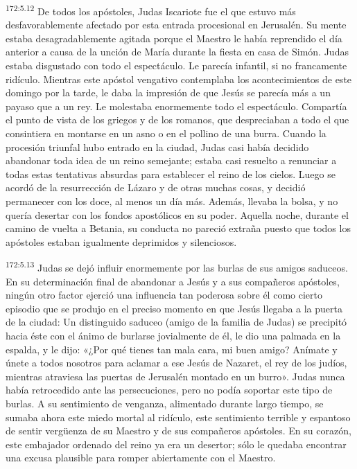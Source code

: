 \par
\textsuperscript{172:5.12} De todos los apóstoles, Judas Iscariote fue el que estuvo más desfavorablemente afectado por esta entrada procesional en Jerusalén. Su mente estaba desagradablemente agitada porque el Maestro le había reprendido el día anterior a causa de la unción de María durante la fiesta en casa de Simón. Judas estaba disgustado con todo el espectáculo. Le parecía infantil, si no francamente ridículo. Mientras este apóstol vengativo contemplaba los acontecimientos de este domingo por la tarde, le daba la impresión de que Jesús se parecía más a un payaso que a un rey. Le molestaba enormemente todo el espectáculo. Compartía el punto de vista de los griegos y de los romanos, que despreciaban a todo el que consintiera en montarse en un asno o en el pollino de una burra. Cuando la procesión triunfal hubo entrado en la ciudad, Judas casi había decidido abandonar toda idea de un reino semejante; estaba casi resuelto a renunciar a todas estas tentativas absurdas para establecer el reino de los cielos. Luego se acordó de la resurrección de Lázaro y de otras muchas cosas, y decidió permanecer con los doce, al menos un día más. Además, llevaba la bolsa, y no quería desertar con los fondos apostólicos en su poder. Aquella noche, durante el camino de vuelta a Betania, su conducta no pareció extraña puesto que todos los apóstoles estaban igualmente deprimidos y silenciosos.

\par
\textsuperscript{172:5.13} Judas se dejó influir enormemente por las burlas de sus amigos saduceos. En su determinación final de abandonar a Jesús y a sus compañeros apóstoles, ningún otro factor ejerció una influencia tan poderosa sobre él como cierto episodio que se produjo en el preciso momento en que Jesús llegaba a la puerta de la ciudad: Un distinguido saduceo (amigo de la familia de Judas) se precipitó hacia éste con el ánimo de burlarse jovialmente de él, le dio una palmada en la espalda, y le dijo: «¿Por qué tienes tan mala cara, mi buen amigo? Anímate y únete a todos nosotros para aclamar a ese Jesús de Nazaret, el rey de los judíos, mientras atraviesa las puertas de Jerusalén montado en un burro». Judas nunca había retrocedido ante las persecuciones, pero no podía soportar este tipo de burlas. A su sentimiento de venganza, alimentado durante largo tiempo, se sumaba ahora este miedo mortal al ridículo, este sentimiento terrible y espantoso de sentir verg\"uenza de su Maestro y de sus compañeros apóstoles. En su corazón, este embajador ordenado del reino ya era un desertor; sólo le quedaba encontrar una excusa plausible para romper abiertamente con el Maestro.